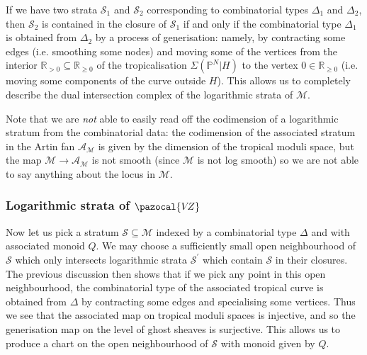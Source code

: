 \documentclass[11pt]{amsart}
\newcommand{\PP}{\mathbb P}
\newcommand{\VZ}{\pazocal{V\!Z}}
\renewcommand{\to}{\rightarrow}
\newcommand{\Acal}{\mathcal{A}}
\newcommand{\Scal}{\mathcal{S}}
\newcommand{\Mcal}{\mathcal{M}}
\newcommand{\RR}{\mathbb{R}}
\theoremstyle{definition}
\theoremstyle{definition}
\begin{document}
If we have two strata $\Scal_1$ and $\Scal_2$ corresponding to combinatorial types $\Delta_1$ and $\Delta_2$, then $\Scal_2$ is contained in the closure of $\Scal_1$ if and only if the combinatorial type $\Delta_1$ is obtained from $\Delta_2$ by a process of generisation: namely, by contracting some edges (i.e. smoothing some nodes) and moving some of the vertices from the interior $\RR_{>0} \subseteq \RR_{\geq 0}$ of the tropicalisation $\Sigma(\PP^N|H)$ to the vertex $0 \in \RR_{\geq 0}$ (i.e. moving some components of the curve outside $H$). This allows us to completely describe the dual intersection complex of the logarithmic strata of $\Mcal$.

Note that we are \emph{not} able to easily read off the codimension of a logarithmic stratum from the combinatorial data: the codimension of the associated stratum in the Artin fan $\Acal_\Mcal$ is given by the dimension of the tropical moduli space, but the map $\Mcal\to\Acal_\Mcal$ is not smooth (since $\Mcal$ is not log smooth) so we are not able to say anything about the locus in $\Mcal$. 

\subsubsection{Logarithmic strata of $\VZ$}
Now let us pick a stratum $\Scal \subseteq \Mcal$ indexed by a combinatorial type $\Delta$ and with associated monoid $Q$. We may choose a sufficiently small open neighbourhood of $\Scal$ which only intersects logarithmic strata $\Scal^\prime$ which contain $\Scal$ in their closures. The previous discussion then shows that if we pick any point in this open neighbourhood, the combinatorial type of the associated tropical curve is obtained from $\Delta$ by contracting some edges and specialising some vertices. Thus we see that the associated map on tropical moduli spaces is injective, and so the generisation map on the level of ghost sheaves is surjective. This allows us to produce a chart on the open neighbourhood of $\Scal$ with monoid given by $Q$.
\end{document}
